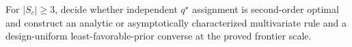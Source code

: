 For \(|S_c|\geq3\), decide whether independent \(q^\star\) assignment is second-order optimal and construct an analytic or asymptotically characterized multivariate rule and a design-uniform least-favorable-prior converse at the proved frontier scale.
